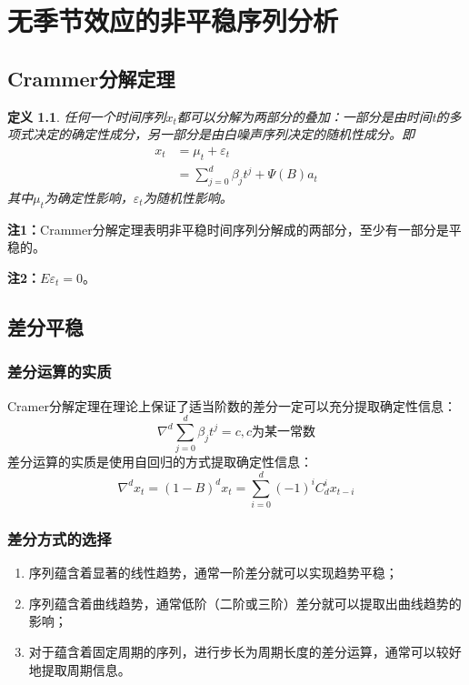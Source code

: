 \documentclass[12pt, a4paper, oneside]{ctexbook}
\newtheorem{definition}[theorem]{定义}
\begin{document}
\chapter{无季节效应的非平稳序列分析}
\section{Crammer分解定理}
\begin{definition}
    任何一个时间序列${x_t}$都可以分解为两部分的叠加：一部分是由时间t的多项式决定的确定性成分，另一部分是由白噪声序列决定的随机性成分。即
    \begin{equation}
        \begin{aligned}
            x_t&={\mu}_t+\varepsilon_t\\
            &=\sum_{j=0}^d\beta_jt^j + \Psi(B)a_t
        \end{aligned}
    \end{equation}
    其中$\mu_t$为确定性影响，$\varepsilon_t$为随机性影响。
\end{definition}

\textbf{注1：}Crammer分解定理表明非平稳时间序列分解成的两部分，至少有一部分是平稳的。

\textbf{注2：}$E \varepsilon_t = 0$。
\section{差分平稳}
\subsection{差分运算的实质}
Cramer分解定理在理论上保证了适当阶数的差分一定可以充分提取确定性信息：
$$
    \nabla^d\sum_{j=0}^d\beta_jt^j=c,c\text{为某一常数}
$$
差分运算的实质是使用自回归的方式提取确定性信息：
$$
    \nabla^dx_t=(1-B)^dx_t=\sum_{i=0}^d(-1)^iC_d^ix_{t-i}
$$

\subsection{差分方式的选择}
\begin{enumerate}[1、]
    \item 序列蕴含着显著的线性趋势，通常一阶差分就可以实现趋势平稳；
    \item 序列蕴含着曲线趋势，通常低阶（二阶或三阶）差分就可以提取出曲线趋势的影响；
    \item 对于蕴含着固定周期的序列，进行步长为周期长度的差分运算，通常可以较好地提取周期信息。
\end{enumerate}
\end{document}
